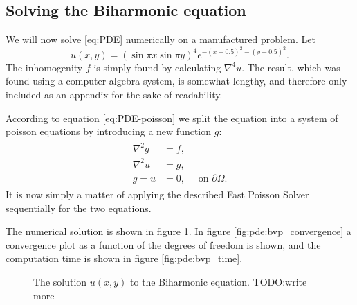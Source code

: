 \subsection{Solving the Biharmonic equation}
\label{sec:pde:solving}
We will now solve \eqref{eq:PDE} numerically on a manufactured problem.
Let
$$
u(x, y) =
\left(
\sin \pi x
\sin \pi y
\right)^4
e^{-(x-0.5)^2 - (y-0.5)^2}.
$$
The inhomogenity $f$ is simply found by calculating $\nabla^4 u$.
The result, which was found using a computer algebra system, is somewhat lengthy, and therefore only included as an appendix for the sake of readability.



According to equation \eqref{eq:PDE-poisson} we split the equation into a system of poisson equations by introducing a new function $g$:
\begin{align*}
  \begin{split}
    \nabla^2g &= f,\\
    \nabla^2u &= g,\\
    g = u &= 0,\quad \text{ on } \partial \Omega.
  \end{split}
\end{align*}
It is now simply a matter of applying the described Fast Poisson Solver sequentially for the two equations.

The numerical solution is shown in figure \ref{fig:pde:bvp}.
In figure \ref{fig:pde:bvp_convergence} a convergence plot as a function of the degrees of freedom is shown, and the computation time is shown in figure \ref{fig:pde:bvp_time}.


\begin{figure}[tb]
  \centering
  \caption{The solution $u(x, y)$ to the Biharmonic equation. TODO:write more}
  \label{fig:pde:bvp}
\end{figure}

